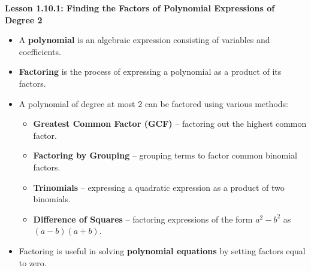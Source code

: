\begin{center}
\textbf{Lesson 1.10.1: Finding the Factors of Polynomial Expressions of Degree 2}
\end{center}

\vspace*{-1.5ex}

\begin{itemize}
    \item A \textbf{polynomial} is an algebraic expression consisting of variables and coefficients.
    \item \textbf{Factoring} is the process of expressing a polynomial as a product of its factors.
    \item A polynomial of degree at most 2 can be factored using various methods:
    \begin{itemize}
        \item \textbf{Greatest Common Factor (GCF)} – factoring out the highest common factor.
        \item \textbf{Factoring by Grouping} – grouping terms to factor common binomial factors.
        \item \textbf{Trinomials} – expressing a quadratic expression as a product of two binomials.
        \item \textbf{Difference of Squares} – factoring expressions of the form $a^2 - b^2$ as $(a - b)(a + b)$.
    \end{itemize}
    \item Factoring is useful in solving \textbf{polynomial equations} by setting factors equal to zero.
\end{itemize}
